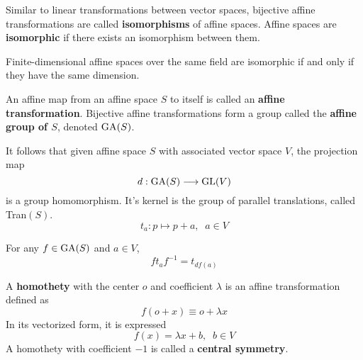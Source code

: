   \begin{definition}
    Similar to linear transformations between vector spaces, bijective affine transformations are called \textbf{isomorphisms} of affine spaces. Affine spaces are \textbf{isomorphic} if there exists an isomorphism between them. 
  \end{definition}

  \begin{corollary}
    Finite-dimensional affine spaces over the same field are isomorphic if and only if they have the same dimension. 
  \end{corollary}

  \begin{definition}
    An affine map from an affine space $S$ to itself is called an \textbf{affine transformation}. Bijective affine transformations form a group called the \textbf{affine group of $S$}, denoted $\operatorname{GA}(S)$. 
  \end{definition}

  It follows that given affine space $S$ with associated vector space $V$, the projection map
  \begin{equation}
    d: \operatorname{GA}(S) \longrightarrow \operatorname{GL}(V)
  \end{equation}
  is a group homomorphism. It's kernel is the group of parallel translations, called Tran$(S)$. 
  \begin{equation}
    t_a : p \mapsto p + a, \;\; a \in V
  \end{equation}

  \begin{theorem}
    For any $f \in \operatorname{GA}(S)$ and $a \in V$, 
    \begin{equation}
      f t_a f^{-1} = t_{df(a)}
    \end{equation}
  \end{theorem}

  \begin{definition}
    A \textbf{homothety} with the center $o$ and coefficient $\lambda$ is an affine transformation defined as
    \begin{equation}
      f( o + x ) \equiv o + \lambda x
    \end{equation}
    In its vectorized form, it is expressed
    \begin{equation}
      f(x) = \lambda x + b, \;\; b \in V
    \end{equation}
    A homothety with coefficient $-1$ is called a \textbf{central symmetry}. 
  \end{definition}

